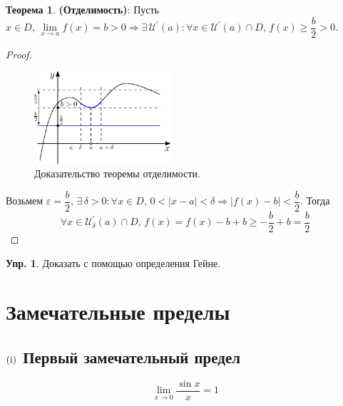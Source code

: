 \documentclass[12pt]{article}
\newcommand{\RN}[1]{%
	\textup{\uppercase\expandafter{\romannumeral#1}}%
}
\theoremstyle{definition}
\newtheorem{exrc}{Упр.}
\newtheorem{theorem}{Теорема}
\begin{document}
\begin{theorem} \textbf{(Отделимость)}:
	Пусть $x \in D, \, \lim\limits_{x \to a} f(x) = b > 0 \Rightarrow \exists \, \mathcal{U}^\prime(a) \colon \forall x \in \mathcal{U}^\prime(a) \cap D, \, f(x) \geq \dfrac{b}{2} > 0$.
\end{theorem}

\begin{proof}
\begin{figure}[H]
	\centering
	\includegraphics[width=0.45\textwidth]{15_2.eps}
	\caption{Доказательство теоремы отделимости.}
	\label{15_2}
\end{figure}
Возьмем $\varepsilon =\dfrac{b}{2}, \, \exists \, \delta > 0 \colon \forall x \in D, \, 0 < |x - a| < \delta \Rightarrow |f(x) - b| < \dfrac{b}{2}$. Тогда 
$$\forall x \in \mathcal{U}_{\delta}^\prime(a) \cap D, \, f(x) = f(x) - b + b \geq -\dfrac{b}{2} + b = \dfrac{b}{2}$$ 
\end{proof}

\begin{exrc}
	Доказать с помощью определения Гейне.
\end{exrc}

\newpage

\section*{Замечательные пределы}

\subsection*{$(\RN{1})$ Первый замечательный предел} 

$$\lim\limits_{x \to 0} \dfrac{\sin{x}}{x} = 1$$
\end{document}
